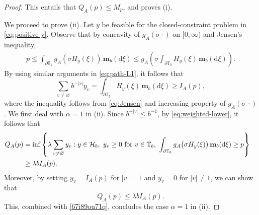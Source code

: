 \documentclass[a4paper, 11pt]{article}
\newcommand{\1}{\mathbf 1}
\theoremstyle{plain}
\begin{document}
\begin{proof}
This entails that \(Q_A(p)\leq M_p\), and proves \textup{(i)}.
\par
We proceed to prove \textup{(ii)}. Let $y$ be feasible for the closed-constraint problem in \eqref{eq:positive-y}. Observe that by concavity of $g_A(\sigma\cdot)$ on $[0,\infty)$ and Jensen's inequality,
\begin{equation}\label{eq:Jensen}
\begin{aligned}
  p\le \int_{\partial\mathbb{T}_b}g_A\left(\sigma H_y(\xi)\right)\,\mathbf m_b(\mathrm{d}\xi)\leq g_A\left(\sigma\int_{\partial\mathbb{T}_b}H_y(\xi)\,\mathbf m_b(\mathrm{d}\xi)\right).
\end{aligned}
\end{equation}
By using similar arguments in \eqref{eq:path-L1}, it follows that
\begin{equation}\label{eq:weighted-lower}
  \sum_{v\ne\varnothing}b^{-\lvert v\rvert}y_v
  =\int_{\partial\mathbb{T}_b}H_y(\xi)\,\mathbf m_b(\mathrm{d}\xi)
  \ge I_A(p),
\end{equation}
where the inequality follows from \eqref{eq:Jensen} and increasing property of \(g_A(\sigma\,\cdot)\). We first deal with
\(\alpha=1\) in (ii).  Since \(b^{-\lvert v\rvert}\le b^{-1}\), by \eqref{eq:weighted-lower}, it follows that
\begin{align}\label{67i89ou71q}
  Q_A(p)&=\inf\left\{\lambda\sum_{v\ne\varnothing}y_v:
    y\in\mathcal{H}_b,~y_v\geq0\ \text{for}\ {v\in\mathbb{T}_b},\ \int_{\partial\mathbb{T}_b}g_A\bigl(\sigma H_{y}(\xi)\bigr)\,\mathbf m_b(\mathrm{d}\xi)\ge p\right\}\cr
    &\geq\lambda bI_A(p).
\end{align}
Moreover, by setting \(y_v=I_A(p)\) for $|v|=1$ and \(y_v=0\) for $|v|\neq1$, we can show that
$$Q_A(p)\leq\lambda bI_A(p).$$
This, combined with \eqref{67i89ou71q}, concludes the case \(\alpha=1\) in \textup{(ii)}.


\end{proof}
\end{document}
